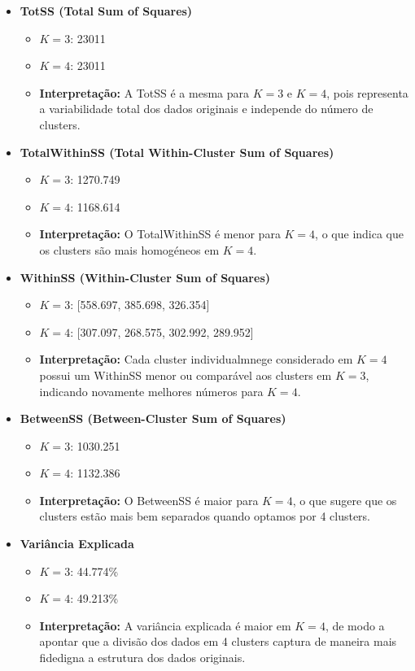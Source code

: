 \documentclass[
  letterpaper,
  DIV=11,
  numbers=noendperiod]{scrartcl}
\providecommand{\tightlist}{%
  \setlength{\itemsep}{0pt}\setlength{\parskip}{0pt}}\usepackage{longtable,booktabs,array}
\begin{document}
\begin{itemize}
\tightlist
\item
  \textbf{TotSS (Total Sum of Squares)}

  \begin{itemize}
  \tightlist
  \item
    \(K=3\): 23011
  \item
    \(K=4\): 23011
  \item
    \textbf{Interpretação:} A TotSS é a mesma para \(K=3\) e \(K=4\),
    pois representa a variabilidade total dos dados originais e
    independe do número de clusters.
  \end{itemize}
\item
  \textbf{TotalWithinSS (Total Within-Cluster Sum of Squares)}

  \begin{itemize}
  \tightlist
  \item
    \(K=3\): 1270.749
  \item
    \(K=4\): 1168.614
  \item
    \textbf{Interpretação:} O TotalWithinSS é menor para \(K=4\), o que
    indica que os clusters são mais homogéneos em \(K=4\).
  \end{itemize}
\item
  \textbf{WithinSS (Within-Cluster Sum of Squares)}

  \begin{itemize}
  \tightlist
  \item
    \(K=3\): {[}558.697, 385.698, 326.354{]}
  \item
    \(K=4\): {[}307.097, 268.575, 302.992, 289.952{]}
  \item
    \textbf{Interpretação:} Cada cluster individualmnege considerado em
    \(K=4\) possui um WithinSS menor ou comparável aos clusters em
    \(K=3\), indicando novamente melhores números para \(K=4\).
  \end{itemize}
\item
  \textbf{BetweenSS (Between-Cluster Sum of Squares)}

  \begin{itemize}
  \tightlist
  \item
    \(K=3\): 1030.251
  \item
    \(K=4\): 1132.386
  \item
    \textbf{Interpretação:} O BetweenSS é maior para \(K=4\), o que
    sugere que os clusters estão mais bem separados quando optamos por 4
    clusters.
  \end{itemize}
\item
  \textbf{Variância Explicada}

  \begin{itemize}
  \tightlist
  \item
    \(K=3\): 44.774\%
  \item
    \(K=4\): 49.213\%
  \item
    \textbf{Interpretação:} A variância explicada é maior em \(K=4\), de
    modo a apontar que a divisão dos dados em 4 clusters captura de
    maneira mais fidedigna a estrutura dos dados originais.
  \end{itemize}
\end{itemize}
\end{document}
